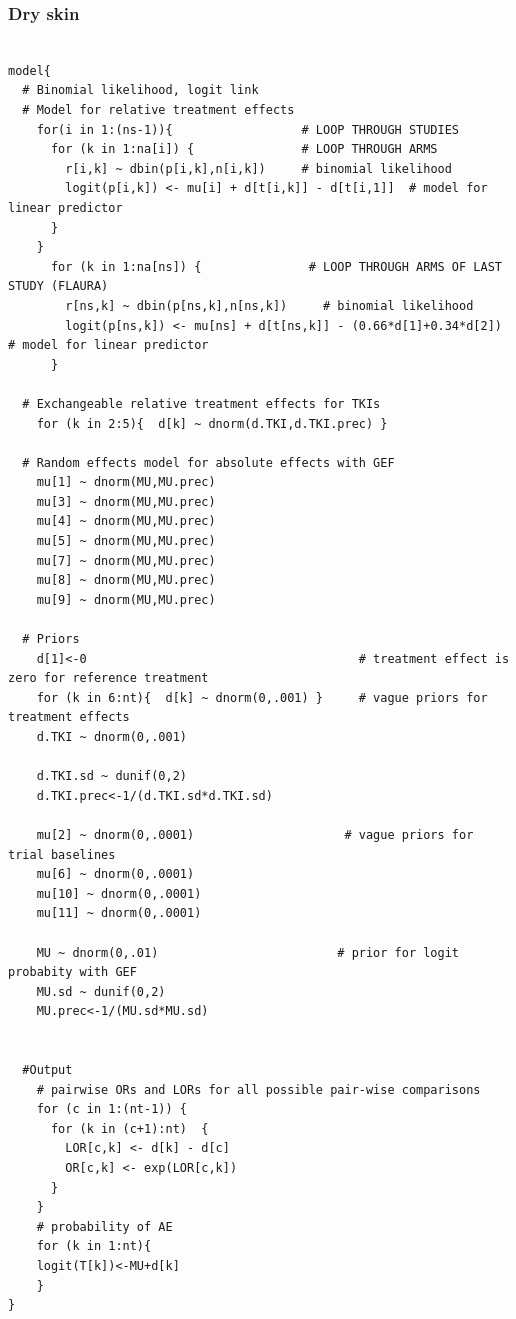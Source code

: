 \documentclass[11pt,final,fleqn]{article}\usepackage[]{graphicx}\usepackage[]{color}
\theoremstyle{plain}
\begin{document}
\begin{appendices}
\subsubsection{Dry skin} 
\begin{verbatim} 

model{
  # Binomial likelihood, logit link
  # Model for relative treatment effects
    for(i in 1:(ns-1)){                  # LOOP THROUGH STUDIES
      for (k in 1:na[i]) {               # LOOP THROUGH ARMS
        r[i,k] ~ dbin(p[i,k],n[i,k])     # binomial likelihood
        logit(p[i,k]) <- mu[i] + d[t[i,k]] - d[t[i,1]]  # model for linear predictor
      }
    }   
      for (k in 1:na[ns]) {               # LOOP THROUGH ARMS OF LAST STUDY (FLAURA)
        r[ns,k] ~ dbin(p[ns,k],n[ns,k])     # binomial likelihood
        logit(p[ns,k]) <- mu[ns] + d[t[ns,k]] - (0.66*d[1]+0.34*d[2])  # model for linear predictor
      }
  
  # Exchangeable relative treatment effects for TKIs
    for (k in 2:5){  d[k] ~ dnorm(d.TKI,d.TKI.prec) }
  
  # Random effects model for absolute effects with GEF
    mu[1] ~ dnorm(MU,MU.prec) 
    mu[3] ~ dnorm(MU,MU.prec)
    mu[4] ~ dnorm(MU,MU.prec)
    mu[5] ~ dnorm(MU,MU.prec) 
    mu[7] ~ dnorm(MU,MU.prec) 
    mu[8] ~ dnorm(MU,MU.prec) 
    mu[9] ~ dnorm(MU,MU.prec)    
       
  # Priors
    d[1]<-0                                      # treatment effect is zero for reference treatment
    for (k in 6:nt){  d[k] ~ dnorm(0,.001) }     # vague priors for treatment effects
    d.TKI ~ dnorm(0,.001)
    
    d.TKI.sd ~ dunif(0,2) 
    d.TKI.prec<-1/(d.TKI.sd*d.TKI.sd)
    
    mu[2] ~ dnorm(0,.0001)                     # vague priors for trial baselines
    mu[6] ~ dnorm(0,.0001)                       
    mu[10] ~ dnorm(0,.0001)                       
    mu[11] ~ dnorm(0,.0001)                       
      
    MU ~ dnorm(0,.01)                         # prior for logit probabity with GEF
    MU.sd ~ dunif(0,2) 
    MU.prec<-1/(MU.sd*MU.sd)
    
      
  #Output 
    # pairwise ORs and LORs for all possible pair-wise comparisons                                       
    for (c in 1:(nt-1)) {                        
      for (k in (c+1):nt)  { 
        LOR[c,k] <- d[k] - d[c]
        OR[c,k] <- exp(LOR[c,k])
      }  
    }
    # probability of AE
    for (k in 1:nt){ 
    logit(T[k])<-MU+d[k]
    }
}


\end{verbatim}
\end{appendices}
\end{document}
